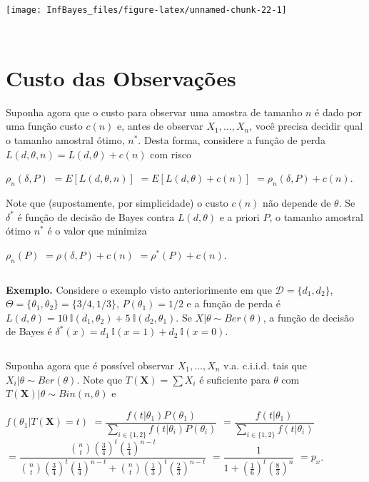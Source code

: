 \documentclass[
]{book}
\begin{document}
\begin{center}\texttt{[image: InfBayes\_files/figure-latex/unnamed-chunk-22-1]} \end{center}

\(~\)

\(~\)

\hypertarget{custo-das-observauxe7uxf5es}{%
\section{Custo das Observações}\label{custo-das-observauxe7uxf5es}}

Suponha agora que o custo para observar uma amostra de tamanho \(n\) é dado por uma função custo \(c(n)\) e, antes de observar \(X_1,\ldots,X_n\), você precisa decidir qual o tamanho amostral ótimo, \(n^*\). Desta forma, considere a função de perda \(L(d,\theta,n) = L(d,\theta) + c(n)\) com risco

\(\rho_n(\delta,P)\) \(= E\left[L(d,\theta,n)\right]\) \(= E\left[L(d,\theta) + c(n)\right]\) \(= \rho_n(\delta,P) + c(n)\).

Note que (supostamente, por simplicidade) o custo \(c(n)\) não depende de \(\theta\). Se \(\delta^*\) é função de decisão de Bayes contra \(L(d,\theta)\) e a priori \(P\), o tamanho amostral ótimo \(n^*\) é o valor que minimiza

\(\rho_n(P)\) \(= \rho(\delta,P) + c(n)\) \(= \rho^*(P) + c(n)\).

\(~\)

\textbf{Exemplo.} Considere o exemplo visto anteriorimente em que \(\mathcal{D}=\{d_1,d_2\}\), \(\Theta=\{\theta_1,\theta_2\}=\{3/4,1/3\}\), \(P(\theta_1)=1/2\) e a função de perda é \(L(d,\theta)=10~\mathbb{I}(d_1,\theta_2) + 5~\mathbb{I}(d_2,\theta_1)\). Se \(X|\theta \sim Ber(\theta)\), a função de decisão de Bayes é \(\delta^*(x)=d_1~\mathbb{I}(x=1)+d_2~\mathbb{I}(x=0)\).

\(~\)

Suponha agora que é possível observar \(X_1,\ldots,X_n\) v.a. c.i.i.d. tais que \(X_i|\theta \sim Ber(\theta)\). Note que \(T(\boldsymbol X)=\sum X_i\) é suficiente para \(\theta\) com \(T(\boldsymbol X)|\theta \sim Bin(n,\theta)\) e

\(f(\theta_1|T(\boldsymbol X)=t)\)
\(=\dfrac{f(t|\theta_1)P(\theta_1)}{\displaystyle \sum_{i\in\{1,2\}} f(t|\theta_i)P(\theta_i)}\)
\(=\dfrac{f(t|\theta_1)}{\displaystyle \sum_{i\in\{1,2\}} f(t|\theta_i)}\)
\(=\dfrac{\binom{n}{t}\left(\frac{3}{4}\right)^t\left(\frac{1}{4}\right)^{n-t}}{\binom{n}{t}\left(\frac{3}{4}\right)^t\left(\frac{1}{4}\right)^{n-t}+\binom{n}{t}\left(\frac{1}{3}\right)^t\left(\frac{2}{3}\right)^{n-t}}\)
\(=\dfrac{1}{1+\left(\frac{1}{6}\right)^t\left(\frac{8}{3}\right)^{n}}\) \(=p_x\).
\end{document}
